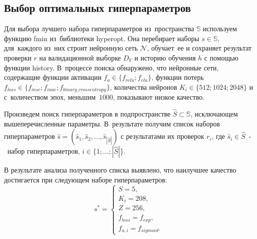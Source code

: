 \subsection{Выбор оптимальных гиперпараметров}\label{subsec:opt_hyper}

Для выбора лучшего набора гиперпараметров из~пространства $\mathbb{S}$ используем функцию fmin\cite[раздел FMin]{bib:hyperopt} из~библиотеки hyperopt.
Она перебирает наборы $s \in \mathbb{S}$, для~каждого из~них строит нейронную сеть $\mathcal{N}$, обучает~ее
и сохраняет результат проверки $r$ на валидационной выборке $D_V$ и историю обучения $h$ с помощью функции history\cite[раздел callbacks]{bib:keras}.
В~процессе поиска обнаружено, что нейронные сети, содержащие функции активации  $f_a \in \{f_{relu}; f_{elu}\}$, функции потерь $f_{loss} \in \{f_{mse}; f_{mae}; f_{binary\_crossentropy}\}$, количества нейронов $K_i \in \{512; 1024; 2048\}$ и с~количеством эпох, меньшим~$1000$, показывают низкое качество.

Произведем поиск гиперпараметров в подпространстве $\hat{S} \subset \mathbb{S}$, исключающем вышеперечисленные параметры.
В~результате получим список наборов гиперпараметров $\widehat{s} = (\widehat{s}_1, \widehat{s}_2, \dots, \widehat{s}_{|\hat{S}|})$ с результатами их проверок $r_i$,
где $\widehat{s}_i \in \hat{S}$~-~набор гиперпараметров, $i \in \{1; \dots; |\hat{S}|$\}.

В результате анализа полученного списка выявлено, что наилучшее качество достигается при следующем наборе гиперпараметров:
\begin{equation}\label{eq:hyper_set}
    s^* =
    \begin{cases}
        S = 5, \\
        K_i = 208, \\
        Z = 256, \\
        f_{loss} = f_{exp}, \\
        f_{a,i} = f_{sigmoid}.
    \end{cases}
\end{equation}


\newpage 